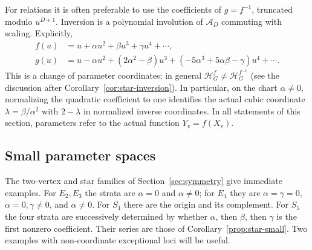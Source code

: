 \documentclass[reqno]{article}
\theoremstyle{plain} %
\theoremstyle{definition}
\theoremstyle{remark}
\newcommand{\cA}{{\mathscr{A}}}
\newcommand{\hs}{\mathscr{H}}
\numberwithin{equation}{section}
\begin{document}
For relations it is often preferable to use the coefficients of
$g=f^{-1}$, truncated modulo $u^{D+1}$. Inversion is a polynomial
involution of $\cA_D$ commuting with scaling. Explicitly,
\begin{equation}\label{eq:inverse-jet}
\begin{split}
f(u)&=u+\alpha u^2+\beta u^3+\gamma u^4+\cdots,\\
g(u)&=u-\alpha u^2+(2\alpha^2-\beta)u^3
       +(-5\alpha^3+5\alpha\beta-\gamma)u^4+\cdots.
\end{split}
\end{equation}
This is a change of parameter coordinates; in general
$\hs_G^f\ne\hs_G^{f^{-1}}$ (see the discussion after
Corollary~\ref{cor:star-inversion}). In particular, on the chart $\alpha\ne0$,
normalizing the quadratic coefficient to one identifies the actual cubic
coordinate $\lambda=\beta/\alpha^2$ with $2-\lambda$ in normalized
inverse coordinates. In all statements of this section, parameters refer
to the actual function $Y_v=f(X_v)$.

\subsection{Small parameter spaces}
\label{sec:small-strata}

The two-vertex and star families of Section~\ref{sec:symmetry} give
immediate examples. For $E_2,E_3$ the strata are $\alpha=0$ and
$\alpha\ne0$; for $E_4$ they are
$\alpha=\gamma=0$, $\alpha=0,\gamma\ne0$, and $\alpha\ne0$.
For $S_4$ there are the origin and its complement. For $S_5$ the four
strata are successively determined by whether $\alpha$, then $\beta$,
then $\gamma$ is the first nonzero coefficient. Their series are those
of Corollary~\ref{prop:star-small}.
Two examples with non-coordinate exceptional loci will be useful.
\end{document}
